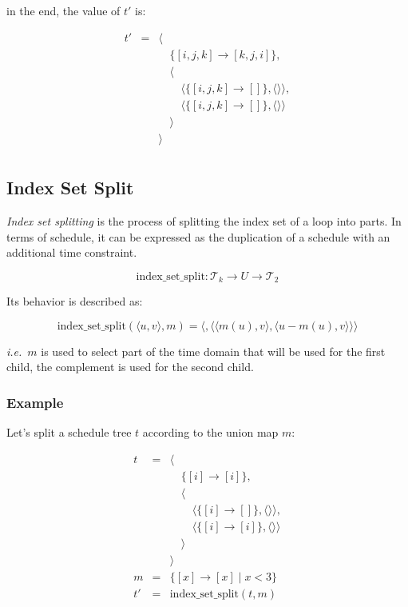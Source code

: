 \documentclass{article}
\begin{document}
\noindent in the end, the value of $t'$ is:

\[
    \begin{array}{lcl}
        t'&=& \langle \\
          & & \quad\{[i,j,k] \rightarrow [k,j,i] \},\\
          & & \quad\langle \\
          & & \quad\quad \langle\{ [i,j,k] \rightarrow [] \}, \langle\rangle\rangle,\\
          & & \quad\quad \langle\{ [i,j,k] \rightarrow [] \}, \langle\rangle\rangle\\
          & & \quad\rangle \\
          & & \rangle \\
    \end{array}
\]


\subsection{Index Set Split}

\emph{Index set splitting} is the process of splitting the index set of a loop
into parts. In terms of schedule, it can be expressed as the duplication of a
schedule with an additional time constraint.

\[
    \mathrm{index\_set\_split}: \mathcal{T}_k \rightarrow U \rightarrow \mathcal{T}_2
\]

Its behavior is described as:

\[
    \mathrm{index\_set\_split}(\langle u, v\rangle, m) = \langle  {}, \langle  \langle  m(u), v\rangle, \langle  u - m(u), v\rangle \rangle \rangle
\]

\noindent \emph{i.e.}\ $m$ is used to select part of the time domain that will
be used for the first child, the complement is used for the second child.

\subsubsection*{Example}

Let's split a schedule tree $t$ according to the union map $m$:

\[
    \begin{array}{lcl}
        t &=& \langle \\
          & & \quad\{[i] \rightarrow [i] \},\\
          & & \quad\langle \\
          & & \quad\quad \langle\{ [i] \rightarrow [] \}, \langle\rangle\rangle,\\
          & & \quad\quad \langle\{ [i] \rightarrow [i] \}, \langle\rangle\rangle\\
          & & \quad\rangle \\
          & & \rangle \\
        m &=& \{ [x] \rightarrow [x] \mid x < 3 \} \\
        t'&=& \mathrm{index\_set\_split}(t, m) \\
    \end{array}
\]
\end{document}
